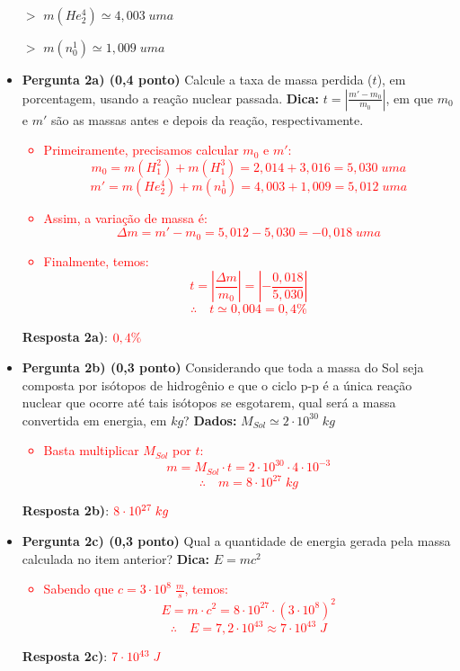 \documentclass[a4paper, 12pt]{article}
\newcommand{\red}[1]{\textcolor{red}{#1}}
\begin{document}
\begin{flushleft}
\begin{itemize}
\begin{multicols}{2}
\begin{itemize}
					\item[$>$] $m(He_2^4) \simeq 4,003 \; uma$
					\item[$>$] $m(n_0^1) \simeq 1,009 \; uma$
				\end{itemize} \end{multicols}
				\begin{itemize}
					\item \textbf{Pergunta 2a) (0,4 ponto)} Calcule a taxa de massa perdida ($t$), em porcentagem, usando a reação nuclear passada. \linebreak
						\textbf{Dica:} $t= \left| \frac{m'-m_0}{m_0} \right|$, em que $m_0$ e $m'$ são as massas antes e depois da reação, respectivamente.
						\red{\begin{itemize}
							\item Primeiramente, precisamos calcular $m_0$ e $m'$:
								$$m_0 = m(H_1^2) + m(H_1^3) = 2,014 + 3,016 = 5,030 \; uma$$
								$$m' = m(He_2^4) + m(n_0^1) = 4,003 + 1,009 = 5,012 \; uma$$
							\item Assim, a variação de massa é:
								$$\Delta m = m' - m_0 = 5,012 - 5,030 = - 0,018 \; uma$$
							\item Finalmente, temos:
								$$t = \left| \frac{\Delta m}{m_0} \right| = \left| - \frac{0,018}{5,030} \right|$$
								$$\therefore \quad t \simeq 0,004 = 0,4\%$$
						\end{itemize}}
						\textbf{Resposta 2a)}: $\red{0,4\%}$
					\item \textbf{Pergunta 2b) (0,3 ponto)} Considerando que toda a massa do Sol seja composta por isótopos de hidrogênio e que o ciclo p-p é a única reação nuclear que ocorre até tais isótopos se esgotarem, qual será a massa convertida em energia, em $kg$? \linebreak
						\textbf{Dados:} $M_{Sol} \simeq 2 \cdot 10^{30} \; kg$
						\red{\begin{itemize}
							\item Basta multiplicar $M_{Sol}$ por $t$:
								$$m = M_{Sol} \cdot t = 2 \cdot 10^{30} \cdot 4 \cdot 10^{-3}$$
								$$\therefore \quad m = 8 \cdot 10^{27} \; kg$$
						\end{itemize}}
						\textbf{Resposta 2b)}: $\red{8 \cdot 10^{27} \; kg}$
					\item \textbf{Pergunta 2c) (0,3 ponto)} Qual a quantidade de energia gerada pela massa calculada no item anterior? \linebreak
						\textbf{Dica:} $E = m c^2$
						\red{\begin{itemize}
							\item Sabendo que $c=3 \cdot 10^8 \; \frac{m}{s}$, temos:
								$$E = m \cdot c^2 = 8 \cdot 10^{27} \cdot (3 \cdot 10^8)^2$$
								$$\therefore \quad E = 7,2 \cdot 10^{43} \approx 7 \cdot 10^{43} \; J$$
						\end{itemize}}
						\textbf{Resposta 2c)}: $\red{7 \cdot 10^{43} \; J}$
				\end{itemize}
				

\end{itemize}
\end{flushleft}
\end{document}
